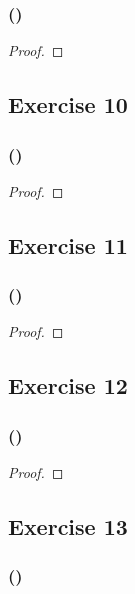 \documentclass[14pt]{extarticle}
\begin{document}
\subsubsection{()}

\begin{proof}

\end{proof}

\subsection{Exercise 10}

\subsubsection{()}

\begin{proof}

\end{proof}

\subsection{Exercise 11}

\subsubsection{()}

\begin{proof}

\end{proof}

\subsection{Exercise 12}

\subsubsection{()}

\begin{proof}

\end{proof}

\subsection{Exercise 13}

\subsubsection{()}
\end{document}
